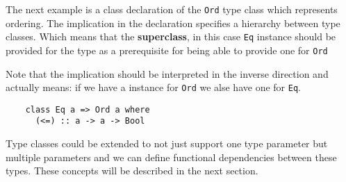 The next example is a class declaration of the \texttt{Ord} type class which
represents ordering. The implication in the declaration specifies a hierarchy
between type classes. Which means that the \textbf{superclass}, in this case
\texttt{Eq} instance should be provided for the type as a prerequisite for being
able to provide one for \texttt{Ord} %

Note that the implication should be interpreted in the inverse direction and
actually means: if we have a instance for \texttt{Ord} we alse have one for
\texttt{Eq}.
\begin{verbatim}
    class Eq a => Ord a where
      (<=) :: a -> a -> Bool
\end{verbatim}

Type classes could be extended to not just support one type parameter but
multiple parameters and we can define functional dependencies between these
types. These concepts will be described in the next section.

